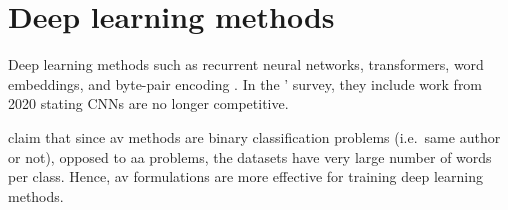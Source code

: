 \section{Deep learning methods}
\label{sec:deep_learning_methods}

Deep learning methods such as recurrent neural networks, transformers, word embeddings, and byte-pair encoding \citep{tyo_state_2022}.
In the \citet{tyo_state_2022}' survey, they include work from 2020 stating CNNs are no longer competitive.

\citet{tyo_state_2022} claim that since \ac{av} methods are binary classification problems (i.e.\ same author or not), 
opposed to \ac{aa} problems, the datasets have very large number of words per class. 
Hence, \ac{av} formulations are more effective for training deep learning methods.